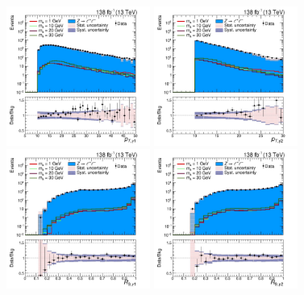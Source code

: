 \begin{figure}[htbp]
  \begin{center}
		\includegraphics[width=0.42\textwidth]{figures/chapter04/BDT_input/pho1Pt_log.pdf}
    \includegraphics[width=0.42\textwidth]{figures/chapter04/BDT_input/pho2Pt_log.pdf} \\
		\includegraphics[width=0.42\textwidth]{figures/chapter04/BDT_input/pho1R9_log.pdf}
		\includegraphics[width=0.42\textwidth]{figures/chapter04/BDT_input/pho2R9_log.pdf}\\

\end{center}
\end{figure}
